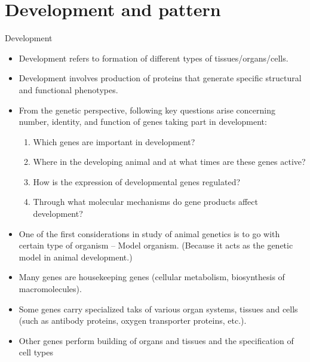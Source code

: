 \documentclass[11pt,dvipsnames,ignorenonframetext,aspectratio=169]{beamer}
\providecommand{\tightlist}{%
  \setlength{\itemsep}{0pt}\setlength{\parskip}{0pt}}
\begin{document}
\hypertarget{development-and-pattern}{%
\section{Development and pattern}\label{development-and-pattern}}

\begin{frame}{Development}
\protect\hypertarget{development}{}

\begin{itemize}
\tightlist
\item
  Development refers to formation of different types of
  tissues/organs/cells.
\item
  Development involves production of proteins that generate specific
  structural and functional phenotypes.
\item
  From the genetic perspective, following key questions arise concerning
  number, identity, and function of genes taking part in development:

  \begin{enumerate}
  \tightlist
  \item
    Which genes are important in development?
  \item
    Where in the developing animal and at what times are these genes
    active?
  \item
    How is the expression of developmental genes regulated?
  \item
    Through what molecular mechanisms do gene products affect
    development?
  \end{enumerate}
\end{itemize}

\end{frame}

\begin{frame}{}
\protect\hypertarget{section-2}{}

\begin{itemize}
\tightlist
\item
  One of the first considerations in study of animal genetics is to go
  with certain type of organism -- Model organism. (Because it acts as
  the genetic model in animal development.)
\item
  Many genes are housekeeping genes (cellular metabolism, biosynthesis
  of macromolecules).
\item
  Some genes carry specialized taks of various organ systems, tissues
  and cells (such as antibody proteins, oxygen transporter proteins,
  etc.).
\item
  Other genes perform building of organs and tissues and the
  specification of cell types
\end{itemize}

\end{frame}
\end{document}
